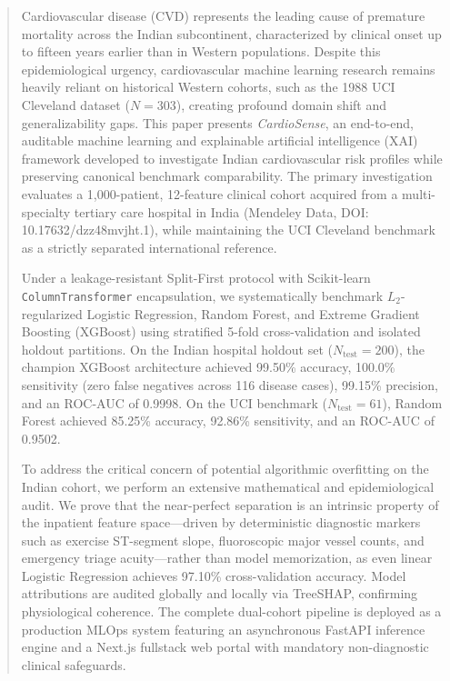 \documentclass[conference]{IEEEtran}
\begin{document}
\begin{abstract}
Cardiovascular disease (CVD) represents the leading cause of premature mortality across the Indian subcontinent, characterized by clinical onset up to fifteen years earlier than in Western populations. Despite this epidemiological urgency, cardiovascular machine learning research remains heavily reliant on historical Western cohorts, such as the 1988 UCI Cleveland dataset ($N=303$), creating profound domain shift and generalizability gaps. This paper presents \textit{CardioSense}, an end-to-end, auditable machine learning and explainable artificial intelligence (XAI) framework developed to investigate Indian cardiovascular risk profiles while preserving canonical benchmark comparability. The primary investigation evaluates a 1,000-patient, 12-feature clinical cohort acquired from a multi-specialty tertiary care hospital in India (Mendeley Data, DOI: 10.17632/dzz48mvjht.1), while maintaining the UCI Cleveland benchmark as a strictly separated international reference. 

Under a leakage-resistant Split-First protocol with Scikit-learn \texttt{ColumnTransformer} encapsulation, we systematically benchmark $L_2$-regularized Logistic Regression, Random Forest, and Extreme Gradient Boosting (XGBoost) using stratified 5-fold cross-validation and isolated holdout partitions. On the Indian hospital holdout set ($N_{\text{test}}=200$), the champion XGBoost architecture achieved 99.50\% accuracy, 100.0\% sensitivity (zero false negatives across 116 disease cases), 99.15\% precision, and an ROC-AUC of 0.9998. On the UCI benchmark ($N_{\text{test}}=61$), Random Forest achieved 85.25\% accuracy, 92.86\% sensitivity, and an ROC-AUC of 0.9502. 

To address the critical concern of potential algorithmic overfitting on the Indian cohort, we perform an extensive mathematical and epidemiological audit. We prove that the near-perfect separation is an intrinsic property of the inpatient feature space—driven by deterministic diagnostic markers such as exercise ST-segment slope, fluoroscopic major vessel counts, and emergency triage acuity—rather than model memorization, as even linear Logistic Regression achieves 97.10\% cross-validation accuracy. Model attributions are audited globally and locally via TreeSHAP, confirming physiological coherence. The complete dual-cohort pipeline is deployed as a production MLOps system featuring an asynchronous FastAPI inference engine and a Next.js fullstack web portal with mandatory non-diagnostic clinical safeguards.
\end{abstract}
\end{document}
